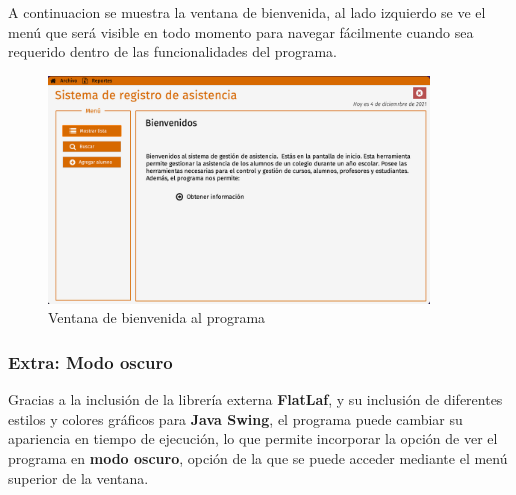 A continuacion se muestra la ventana de bienvenida, al lado izquierdo se ve el menú que será visible en todo momento para navegar fácilmente cuando sea requerido dentro de las funcionalidades del programa.

\begin{figure}[h]
    \centering
    \includegraphics[width=0.9\textwidth]{contents/img/gui/img2}
    \caption{Ventana de bienvenida al programa}
    \label{fig:gui2}
\end{figure}

\subsubsection*{Extra: Modo oscuro}

Gracias a la inclusión de la librería externa \textbf{FlatLaf}, y su inclusión de diferentes estilos y colores gráficos para \textbf{Java Swing}, el programa puede cambiar su apariencia en tiempo de ejecución, lo que permite incorporar la opción de ver el programa en \textbf{modo oscuro}, opción de la que se puede acceder mediante el menú superior de la ventana.

